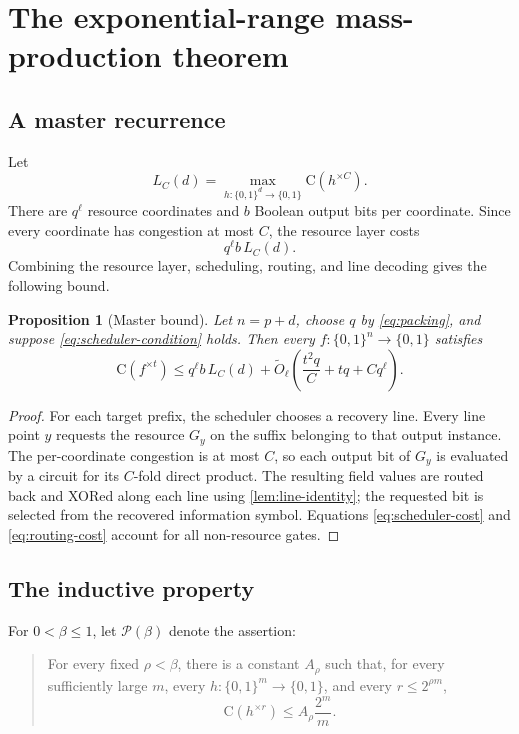 \documentclass[11pt]{article}
\newtheorem{proposition}[theorem]{Proposition}
\theoremstyle{definition}
\newcommand{\bits}{\{0,1\}}
\newcommand{\C}{\mathrm{C}}
\begin{document}
\section{The exponential-range mass-production theorem}

\subsection{A master recurrence}

Let
\[
 L_C(d)=\max_{h:\bits^d\to\bits}\C(h^{\times C}).
\]
There are $q^\ell$ resource coordinates and $b$ Boolean output bits per coordinate.  Since every coordinate has congestion at most $C$, the resource layer costs
\[
 q^\ell b\,L_C(d).
\]
Combining the resource layer, scheduling, routing, and line decoding gives the following bound.

\begin{proposition}[Master bound]\label{prop:master}
Let $n=p+d$, choose $q$ by \cref{eq:packing}, and suppose \cref{eq:scheduler-condition} holds.  Then every $f:\bits^n\to\bits$ satisfies
\begin{equation}\label{eq:master}
 \C(f^{\times t})
 \le
 q^\ell b\,L_C(d)
 +\widetilde O_\ell\!\left(
      \frac{t^2q}{C}+tq+Cq^\ell
   \right).
\end{equation}
\end{proposition}

\begin{proof}
For each target prefix, the scheduler chooses a recovery line.  Every line point $y$ requests the resource $G_y$ on the suffix belonging to that output instance.  The per-coordinate congestion is at most $C$, so each output bit of $G_y$ is evaluated by a circuit for its $C$-fold direct product.  The resulting field values are routed back and XORed along each line using \cref{lem:line-identity}; the requested bit is selected from the recovered information symbol.  Equations \eqref{eq:scheduler-cost} and \eqref{eq:routing-cost} account for all non-resource gates.
\end{proof}

\subsection{The inductive property}

For $0<\beta\le1$, let $\mathcal P(\beta)$ denote the assertion:

\begin{quote}
For every fixed $\rho<\beta$, there is a constant $A_\rho$ such that, for every sufficiently large $m$, every $h:\bits^m\to\bits$, and every $r\le2^{\rho m}$,
\[
 \C(h^{\times r})\le A_\rho\frac{2^m}{m}.
\]
\end{quote}
\end{document}
